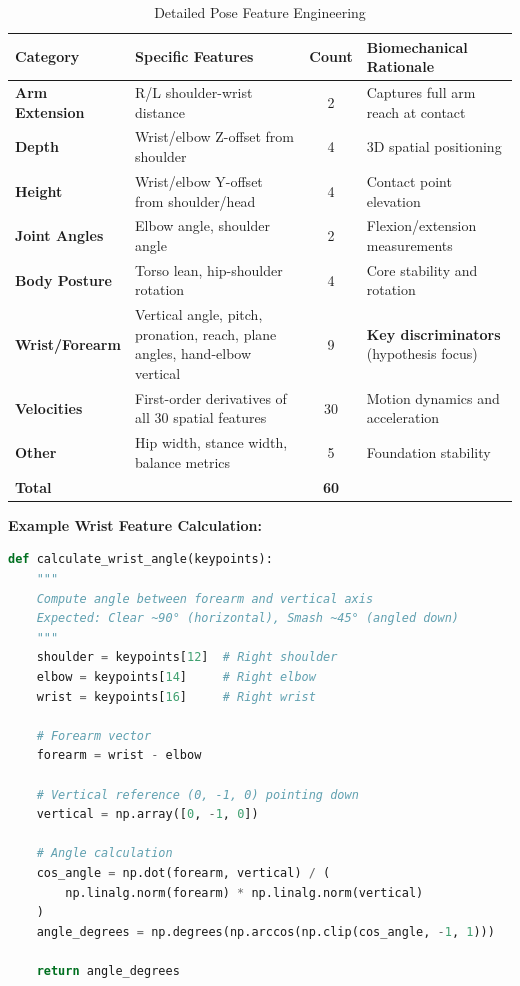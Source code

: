 \documentclass[11pt,a4paper]{article}
\begin{document}
\begin{table}[H]
\centering
\caption{Detailed Pose Feature Engineering}
\small
\begin{tabular}{llcp{5cm}}
\toprule
Category & Specific Features & Count & Biomechanical Rationale \\
\midrule
\textbf{Arm Extension} & R/L shoulder-wrist distance & 2 & Captures full arm reach at contact \\
\textbf{Depth} & Wrist/elbow Z-offset from shoulder & 4 & 3D spatial positioning \\
\textbf{Height} & Wrist/elbow Y-offset from shoulder/head & 4 & Contact point elevation \\
\textbf{Joint Angles} & Elbow angle, shoulder angle & 2 & Flexion/extension measurements \\
\textbf{Body Posture} & Torso lean, hip-shoulder rotation & 4 & Core stability and rotation \\
\textbf{Wrist/Forearm} & Vertical angle, pitch, pronation, reach, plane angles, hand-elbow vertical & 9 & \textbf{Key discriminators} (hypothesis focus) \\
\textbf{Velocities} & First-order derivatives of all 30 spatial features & 30 & Motion dynamics and acceleration \\
\textbf{Other} & Hip width, stance width, balance metrics & 5 & Foundation stability \\
\midrule
\textbf{Total} & & \textbf{60} & \\
\bottomrule
\end{tabular}
\end{table}

\textbf{Example Wrist Feature Calculation:}

\begin{lstlisting}[language=Python, caption=Wrist Vertical Angle Computation]
def calculate_wrist_angle(keypoints):
    """
    Compute angle between forearm and vertical axis
    Expected: Clear ~90° (horizontal), Smash ~45° (angled down)
    """
    shoulder = keypoints[12]  # Right shoulder
    elbow = keypoints[14]     # Right elbow
    wrist = keypoints[16]     # Right wrist

    # Forearm vector
    forearm = wrist - elbow

    # Vertical reference (0, -1, 0) pointing down
    vertical = np.array([0, -1, 0])

    # Angle calculation
    cos_angle = np.dot(forearm, vertical) / (
        np.linalg.norm(forearm) * np.linalg.norm(vertical)
    )
    angle_degrees = np.degrees(np.arccos(np.clip(cos_angle, -1, 1)))

    return angle_degrees
\end{lstlisting}
\end{document}
